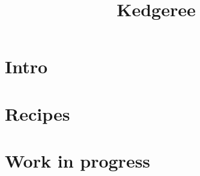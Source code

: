 \documentclass[11pt]{book}
\title{Kedgeree}
\author{}
\begin{document}
\maketitle
\def\title#1{\chapter{#1}}
\tableofcontents

\part{Intro}
        
        
\part{Recipes}
        
        
\part{Work in progress}
        
        
\end{document}
